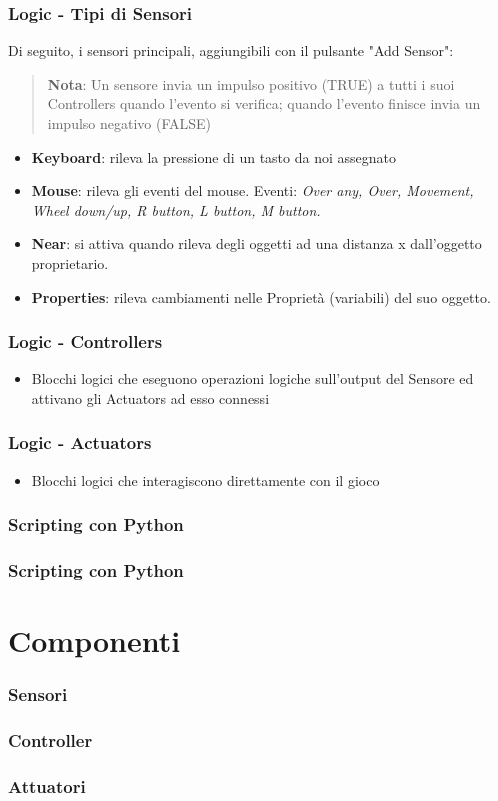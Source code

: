 \documentclass{beamer}
\begin{document}
		\begin{frame}
			\frametitle{Logic - Tipi di Sensori}
			Di seguito, i sensori principali, aggiungibili con il pulsante "Add Sensor":
			\begin{quote}
			\textbf{Nota}: Un sensore invia un impulso positivo (TRUE) a tutti i suoi Controllers quando l'evento si verifica; quando l'evento finisce invia un impulso negativo (FALSE)
			\end{quote}
			\begin{itemize}
				\item \textbf{Keyboard}: rileva la pressione di un tasto da noi assegnato %
				\item \textbf{Mouse}: rileva gli eventi del mouse. Eventi: \textit{Over any, Over, Movement, Wheel down/up, R button, L button, M button.}
				\item \textbf{Near}: si attiva quando rileva degli oggetti ad una distanza x dall'oggetto proprietario.
				\item \textbf{Properties}: rileva cambiamenti nelle Proprietà (variabili) del suo oggetto.
			\end{itemize}
		\end{frame}	
		
		\begin{frame}
			\frametitle{Logic - Controllers} %
			\begin{itemize}
				\item Blocchi logici che eseguono operazioni logiche sull'output del Sensore ed attivano gli Actuators ad esso connessi
			\end{itemize}
		\end{frame}	
		\begin{frame}
			\frametitle{Logic - Actuators} %
			\begin{itemize}
				\item Blocchi logici che interagiscono direttamente con il gioco
			\end{itemize}
		\end{frame}			
		
		\begin{frame}
			\frametitle{Scripting con Python}
		\end{frame}	
		
		\begin{frame}
			\frametitle{Scripting con Python}
		\end{frame}	
	
	\section{Componenti}
		\begin{frame}
			\frametitle{Sensori}
		\end{frame}
		\begin{frame}
			\frametitle{Controller}
		\end{frame}
		\begin{frame}
			\frametitle{Attuatori}
		\end{frame}
\end{document}
